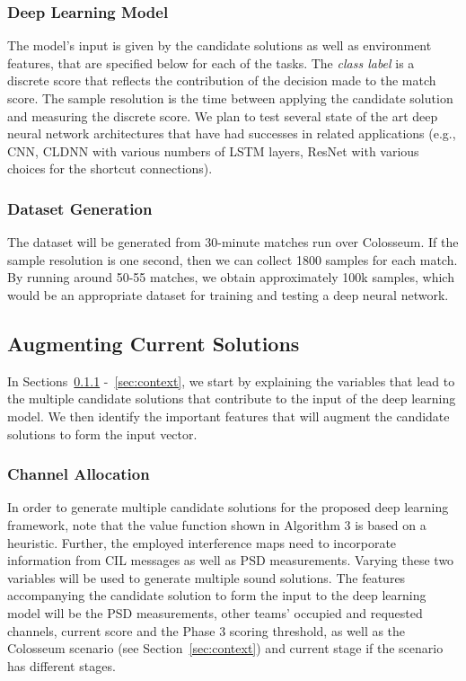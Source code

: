 \documentclass[11pt]{article}
\begin{document}
\subsubsection{Deep Learning Model}
\label{dlm}
The model's input is given by the candidate solutions as well as environment features, that are specified below for each of the tasks. The \emph{class label} is a discrete score that reflects the contribution of the decision made to the match score. The sample resolution is the time between applying the candidate solution and measuring the discrete score. We plan to test several state of the art deep neural network architectures that have had successes in related applications (e.g., CNN, CLDNN with various numbers of LSTM layers, ResNet with various choices for the shortcut connections). 

\subsubsection{Dataset Generation}
The dataset will be generated from 30-minute matches run over Colosseum. If the sample resolution is one second, then we can collect 1800 samples for each match. By running around 50-55 matches, we obtain approximately 100k samples, which would be an appropriate dataset for training and testing a deep neural network. 
\subsection{Augmenting Current Solutions}
In Sections~\ref{sec:chan} -~\ref{sec:context}, we start by explaining the variables that lead to the multiple candidate solutions that contribute to the input of the deep learning model. We then identify the important features that will augment the candidate solutions to form the input vector.  
\subsubsection{Channel Allocation}\label{sec:chan}
In order to generate multiple candidate solutions for the proposed deep learning framework, note that the value function shown in Algorithm 3 is based on a heuristic. Further, the employed interference maps need to incorporate information from CIL messages as well as PSD measurements. Varying these two variables will be used to generate multiple sound solutions. The features accompanying the candidate solution to form the input to the deep learning model will be the PSD measurements, other teams' occupied and requested channels, current score and the Phase 3 scoring threshold, as well as the Colosseum scenario (see Section~\ref{sec:context}) and current stage if the scenario has different stages.
\end{document}
